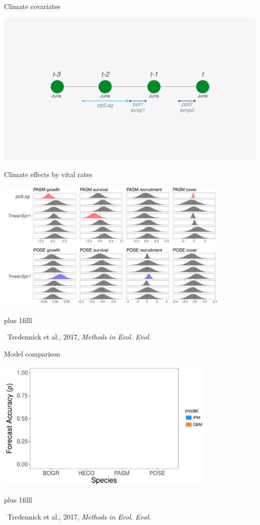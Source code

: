 \documentclass[14pt, compress, aspectratio=1610]{beamer}
\newcommand{\btVFill}{\vskip0pt plus 1filll}
\newcommand{\credit}[1]{\btVFill\par\hfill \footnotesize ~#1}
\begin{document}
\begin{frame}{%
\protect\hypertarget{climate-covariates}{%
Climate covariates}}

\includegraphics[width=\textwidth]{./figures/ipm_climate_effects.pdf}

\end{frame}

\begin{frame}{%
\protect\hypertarget{climate-effects-by-vital-rates}{%
Climate effects by vital rates}}

\centering

\includegraphics[height=2.5in]{./figures/mee_climate_effects.pdf}

\credit{Tredennick et al., 2017, \emph{Methods in Ecol. Evol.}}

\end{frame}

\begin{frame}{%
\protect\hypertarget{model-comparison}{%
Model comparison}}

\centering

\includegraphics[height=2.5in]{./figures/mee_forecast_accuracy_empty.pdf}

\credit{Tredennick et al., 2017, \emph{Methods in Ecol. Evol.}}

\end{frame}
\end{document}
